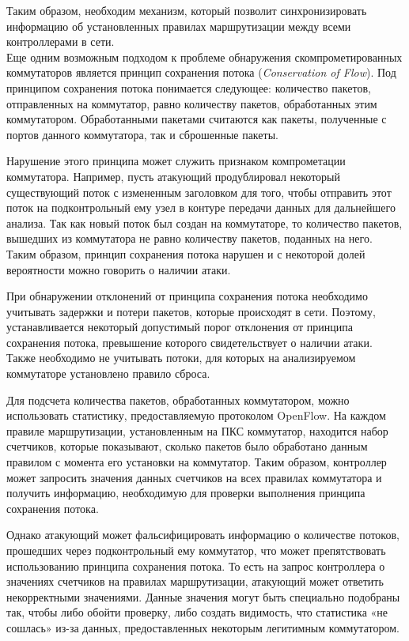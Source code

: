 \documentclass[../thesis.tex]{subfiles}
\begin{document}
Таким образом, необходим механизм, который позволит синхронизировать информацию об установленных правилах маршрутизации между всеми контроллерами в сети.
\\

Еще одним возможным подходом к проблеме обнаружения скомпрометированных коммутаторов является принцип сохранения потока (\textit{Conservation of Flow}).
Под принципом сохранения потока понимается следующее: количество пакетов, отправленных на коммутатор, равно количеству пакетов, обработанных этим коммутатором.
Обработанными пакетами считаются как пакеты, полученные с портов данного коммутатора, так и сброшенные пакеты.

Нарушение этого принципа может служить признаком компрометации коммутатора.
Например, пусть атакующий продублировал некоторый существующий поток с измененным заголовком для того, чтобы отправить этот поток на подконтрольный ему узел в контуре передачи данных для дальнейшего анализа.
Так как новый поток был создан на коммутаторе, то количество пакетов, вышедших из коммутатора не равно количеству пакетов, поданных на него.
Таким образом, принцип сохранения потока нарушен и с некоторой долей вероятности можно говорить о наличии атаки.

При обнаружении отклонений от принципа сохранения потока необходимо учитывать задержки и потери пакетов, которые происходят в сети.
Поэтому, устанавливается некоторый допустимый порог отклонения от принципа сохранения потока, превышение которого свидетельствует о наличии атаки.
Также необходимо не учитывать потоки, для которых на анализируемом коммутаторе установлено правило сброса.

Для подсчета количества пакетов, обработанных коммутатором, можно использовать статистику, предоставляемую протоколом OpenFlow.
На каждом правиле маршрутизации, установленным на ПКС коммутатор, находится набор счетчиков, которые показывают, сколько пакетов было обработано данным правилом с момента его установки на коммутатор.
Таким образом, контроллер может запросить значения данных счетчиков на всех правилах коммутатора и получить информацию, необходимую для проверки выполнения принципа сохранения потока.

Однако атакующий может фальсифицировать информацию о количестве потоков, прошедших через подконтрольный ему коммутатор, что может препятствовать использованию принципа сохранения потока.
То есть на запрос контроллера о значениях счетчиков на правилах маршрутизации, атакующий может ответить некорректными значениями.
Данные значения могут быть специально подобраны так, чтобы либо обойти проверку, либо создать видимость, что статистика «не сошлась» из-за данных, предоставленных некоторым легитимным коммутатором.
\end{document}
